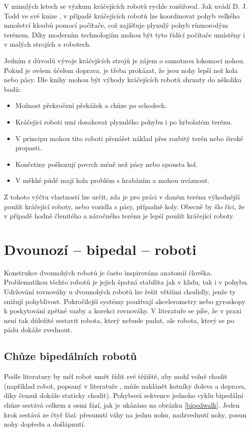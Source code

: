 V minulých letech se výzkum kráčejících robotů rychle rozšiřoval. Jak uvádí D. J. Todd ve své knize \cite{WalkingMachines}, v případě kráčejících robotů lze koordinovat pohyb velkého množství kloubů pomocí počítače, což zajišťuje plynulý pohyb různorodým terénem. Díky moderním technologiím mohou být tyto řídící počítače umístěny i v malých strojích a robotech.

Jedním z důvodů vývoje kráčejících strojů je zájem o samotnou lokomoci nohou. Pokud je ovšem účelem doprava, je třeba prokázat, že jsou nohy lepší než kola nebo pásy. Dle knihy \cite{WalkingMachines} mohou být výhody kráčejících robotů shrnuty do několika bodů:
\begin{itemize}
    \item Možnost překročení překážek a chůze po schodech.
    \item Kráčející roboti umí dosahovat plynulého pohybu i po hrbolatém terénu.
    \item V principu mohou tito roboti přenášet náklad přes rozbitý terén nebo široké propasti.
    \item Končetiny poškozují povrch méně než pásy nebo spousta kol.
    \item V měkké půdě mají kola problém s hrabáním a mohou uváznout.
\end{itemize}

Z tohoto výčtu vlastností lze určit, zda je pro práci v daném terénu výhodnější použít kráčející roboty, nebo vozidla s pásy, případně koly. Obecně by šlo říci, že v případě hodně členitého a náročného terénu je lepší použít kráčející roboty.


\section{Dvounozí -- bipedal -- roboti}
Konstrukce dvounohých robotů je často inspirována anatomií člověka. Problematikou těchto robotů je jejich špatná stabilita jak v klidu, tak i v pohybu. Udržování rovnováhy u dvounohých robotů lze řešit většími chodidly, jenže ty snižují pohyblivost. Pokročilejší systémy používají akcelerometry nebo gyroskopy k poskytování zpětné vazby a korekci rovnováhy. V literatuře \cite{TwoarmedBipedal} se píše, že v praxi není tak důležité sestavit robota, který nebude padat, ale robota, který se po pádu dokáže zvednout.

\subsection*{Chůze bipedálních robotů}
Podle literatury \cite{TwoarmedBipedal} by měl robot umět řídit své těžiště, aby mohl volně chodit (například robot, popsaný v literatuře \cite{TwoarmedBipedal}, může naklánět kotníky doleva a doprava, díky čemuž dokáže staticky chodit). Pohybová sekvence jednoho cyklu bipedální chůze sestává celkem z osmi fází, jak je ukázáno na obrázku \ref{bipedwalk}. Jeden krok sestává ze čtyř fází: přesunutí váhy na jednu nohu, nadzvednutí nohy, posun nohy dopředu a došlápnutí.

